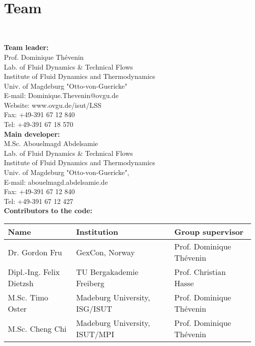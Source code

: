 
\newpage 
\bc 
\section*{Team}  
\ec


\noindent
\textbf{\large{Team leader:}} \\
Prof. Dominique Th\'{e}venin \\
Lab. of Fluid Dynamics \& Technical Flows \\
Institute of Fluid Dynamics and Thermodynamics\\
Univ. of Magdeburg "Otto-von-Guericke"\\
E-mail: Dominique.Thevenin@ovgu.de\\
Website: www.ovgu.de/isut/LSS\\
Fax: +49-391 67 12 840 \\
Tel: +49-391 67 18 570 \\

\noindent
\textbf{\large{Main developer:}} \\
\noindent
M.Sc. Abouelmagd Abdelsamie\\
Lab. of Fluid Dynamics \& Technical Flows\\
Institute of Fluid Dynamics and Thermodynamics\\
Univ. of Magdeburg "Otto-von-Guericke",\\
E-mail: abouelmagd.abdelsamie.de\\
Fax: +49-391 67 12 840 \\
Tel: +49-391 67 12 427 \\




\noindent
\textbf{\large{Contributors to the code:}} \\


\begin{tabular}{l l l}
\hline
\textbf{Name}               &  \textbf{Institution}                  & \textbf{Group supervisor}    \\ 
\hline
Dr. Gordon Fru              & GexCon, Norway                         & Prof. Dominique Th\'{e}venin \\ 
Dipl.-Ing.    Felix Dietzsh & TU Bergakademie Freiberg               & Prof. Christian Hasse        \\
M.Sc. Timo Oster            & Madeburg University, ISG/ISUT          & Prof. Dominique Th\'{e}venin \\           
M.Sc. Cheng Chi            & Madeburg University, ISUT/MPI          & Prof. Dominique Th\'{e}venin \\           
\end{tabular}


